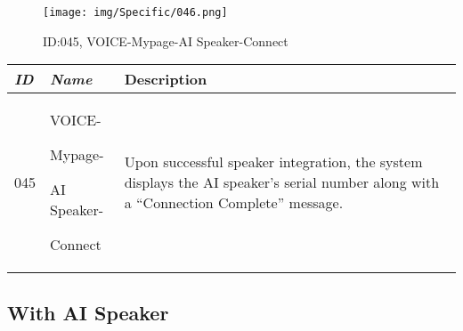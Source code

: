 \documentclass[conference]{IEEEtran}
\begin{document}
\begin{enumerate}[label=\arabic*]
    \vspace{2em}

    \begin{figure}[h]
        \centering
        \texttt{[image: img/Specific/046.png]}
        \caption{ID:045, VOICE-Mypage-AI Speaker-Connect}
    \end{figure}

    \begin{table}[h]
    \def\arraystretch{1.2} \small
        \begin{tabular}{|p{1cm}|p{1.8cm}|p{4.8cm}|}
        \hline
            \textit{\textbf{ID}} & \textit{\textbf{Name}} & {\textbf{Description}} \\
        \hline
            045 \par & VOICE-\par Mypage-\par AI Speaker-\par Connect & Upon successful speaker integration, the system displays the AI speaker's serial number along with a “Connection Complete” message. \\
        \hline
        \end{tabular}
    \end{table}
\end{enumerate}

\vspace{0.7em} %

\clearpage %

\subsection{With AI Speaker}
\vspace{0.5em}
\end{document}
